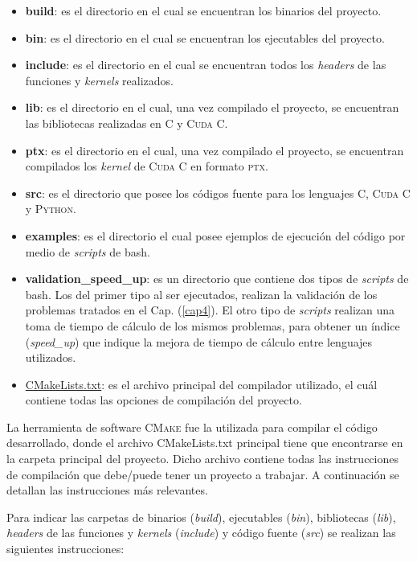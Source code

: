 \begin{itemize}
	\item \textbf{build}: es el directorio en el cual se encuentran los binarios del proyecto.
	\item \textbf{bin}: es el directorio en el cual se encuentran los ejecutables del proyecto.
	\item \textbf{include}: es el directorio en el cual se encuentran todos los \textit{headers} de las funciones y \textit{kernels} realizados.
	\item \textbf{lib}: es el directorio en el cual, una vez compilado el proyecto, se encuentran las bibliotecas realizadas en \textsc{C} y \textsc{Cuda C}.
	\item \textbf{ptx}: es el directorio en el cual, una vez compilado el proyecto, se encuentran compilados los \textit{kernel} de \textsc{Cuda C} en formato \textsc{ptx}.	
	\item \textbf{src}: es el directorio que posee los códigos fuente para los lenguajes \textsc{C}, \textsc{Cuda C} y \textsc{Python}.
	\item \textbf{examples}: es el directorio el cual posee ejemplos de ejecución del código por medio de \textit{scripts} de bash.
	\item \textbf{validation\_speed\_up}: es un directorio que contiene dos tipos de \textit{scripts} de bash. Los del primer tipo al ser ejecutados, realizan la validación de los problemas tratados en el Cap. (\ref{cap4}). El otro tipo de \textit{scripts} realizan una toma de tiempo de cálculo de los mismos problemas, para obtener un índice (\textit{speed\_up}) que indique la mejora de tiempo de cálculo entre lenguajes utilizados. 
	\item \underline{CMakeLists.txt}: es el archivo principal del compilador utilizado, el cuál contiene todas las opciones de compilación del proyecto.
	
\end{itemize}


La herramienta de software \textsc{CMake} fue la utilizada para compilar el código desarrollado,  donde el archivo CMakeLists.txt principal tiene que encontrarse en la carpeta principal del proyecto. Dicho archivo contiene todas las instrucciones de compilación que debe/puede tener un proyecto a trabajar. A continuación se detallan las instrucciones más relevantes.

Para indicar las carpetas de binarios (\textit{build}), ejecutables (\textit{bin}), bibliotecas (\textit{lib}), \textit{headers} de las funciones y \textit{kernels} (\textit{include}) y código fuente (\textit{src}) se realizan las siguientes instrucciones:

